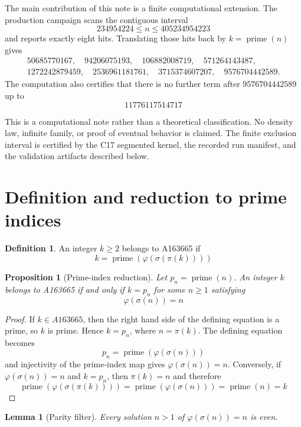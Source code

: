 \documentclass[11pt]{article}
\newtheorem{proposition}[theorem]{Proposition}
\newtheorem{lemma}[theorem]{Lemma}
\theoremstyle{definition}
\newtheorem{definition}[theorem]{Definition}
\theoremstyle{remark}
\newcommand{\seqid}{A163665}
\begin{document}
The main contribution of this note is a finite computational extension.
The production campaign scans the contiguous interval
\[
  234954224 \leq n \leq 405234954223
\]
and reports exactly eight hits.  Translating those hits back by
\(k=\operatorname{prime}(n)\) gives
\[
\begin{gathered}
50685770167,\quad 94206075193,\quad 106882008719,\quad
571264143487,\\
1272242879459,\quad 2536961181761,\quad
3715374607207,\quad 9576704442589.
\end{gathered}
\]
The computation also certifies that there is no further term after
\(9576704442589\) up to
\[
  11776117514717
\]

This is a computational note rather than a theoretical classification.
No density law, infinite family, or proof of eventual behavior is claimed.
The finite exclusion interval is certified by the C17 segmented kernel,
the recorded run manifest, and the validation artifacts described below.

\section{Definition and reduction to prime indices}

\begin{definition}
An integer \(k\geq 2\) belongs to \seqid{} if
\[
  k=\operatorname{prime}(\varphi(\sigma(\pi(k))))
\]
\end{definition}

\begin{proposition}[Prime-index reduction]
\label{prop:reduction}
Let \(p_n=\operatorname{prime}(n)\).  An integer \(k\) belongs to
\seqid{} if and only if \(k=p_n\) for some \(n\geq 1\) satisfying
\[
  \varphi(\sigma(n))=n
\]
\end{proposition}

\begin{proof}
If \(k\in\seqid{}\), then the right hand side of the defining equation is
a prime, so \(k\) is prime.  Hence \(k=p_n\), where \(n=\pi(k)\).  The
defining equation becomes
\[
  p_n=\operatorname{prime}(\varphi(\sigma(n)))
\]
and injectivity of the prime-index map gives \(\varphi(\sigma(n))=n\).
Conversely, if \(\varphi(\sigma(n))=n\) and \(k=p_n\), then \(\pi(k)=n\) and
therefore
\[
  \operatorname{prime}(\varphi(\sigma(\pi(k))))
  =\operatorname{prime}(\varphi(\sigma(n)))
  =\operatorname{prime}(n)=k
\]
\end{proof}

\begin{lemma}[Parity filter]
\label{lem:parity}
Every solution \(n>1\) of \(\varphi(\sigma(n))=n\) is even.
\end{lemma}
\end{document}
